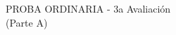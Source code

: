 %
\begin{center}
    \large{
    PROBA ORDINARIA - 3a Avaliación}\\
    \vspace*{0.35cm}
    \large (Parte A)
\end{center}
\vspace*{0.15cm}